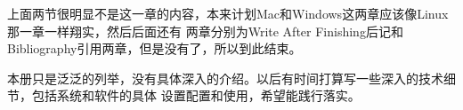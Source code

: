 \documentclass[11pt,fleqn]{book} %
\begin{document}
上面两节很明显不是这一章的内容，本来计划Mac和Windows这两章应该像Linux那一章一样翔实，然后后面还有
两章分别为Write After Finishing后记和Bibliography引用两章，但是没有了，所以到此结束。

本册只是泛泛的列举，没有具体深入的介绍。以后有时间打算写一些深入的技术细节，包括系统和软件的具体
设置配置和使用，希望能践行落实。




\cleardoublepage
{}
\setlength{\columnsep}{0.75cm}
\printindex

\end{document}

